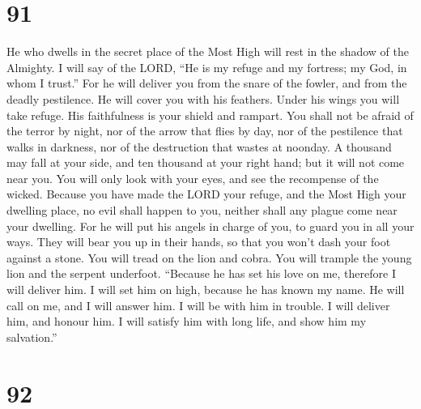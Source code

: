 \hypertarget{section-83}{%
\section{91}\label{section-83}}

 He who dwells in the secret place of the Most High will
rest in the shadow of the Almighty.  I will say of the
LORD, ``He is my refuge and my fortress; my God, in whom I trust.''
 For he will deliver you from the snare of the fowler, and
from the deadly pestilence.  He will cover you with his
feathers. Under his wings you will take refuge. His faithfulness is your
shield and rampart.  You shall not be afraid of the terror
by night, nor of the arrow that flies by day,  nor of the
pestilence that walks in darkness, nor of the destruction that wastes at
noonday.  A thousand may fall at your side, and ten
thousand at your right hand; but it will not come near you.
 You will only look with your eyes, and see the recompense
of the wicked.  Because you have made the LORD your
refuge, and the Most High your dwelling place,  no evil
shall happen to you, neither shall any plague come near your dwelling.
 For he will put his angels in charge of you, to guard
you in all your ways.  They will bear you up in their
hands, so that you won't dash your foot against a stone. 
You will tread on the lion and cobra. You will trample the young lion
and the serpent underfoot.  ``Because he has set his love
on me, therefore I will deliver him. I will set him on high, because he
has known my name.  He will call on me, and I will answer
him. I will be with him in trouble. I will deliver him, and honour him.
 I will satisfy him with long life, and show him my
salvation.''

\hypertarget{section-84}{%
\section{92}\label{section-84}}


